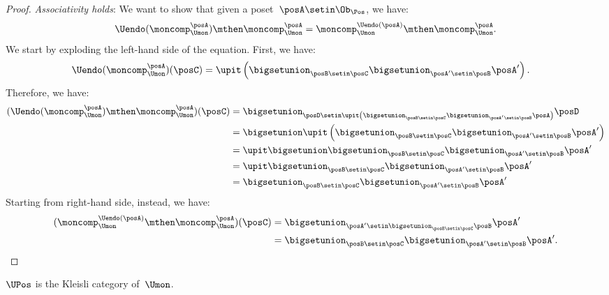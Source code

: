 \begin{proof}
    \emph{Associativity holds}: We want to show that given a poset~$\posA\setin \Ob_\Pos$, we have:
    \begin{equation}
        \Uendo(\moncomp_{\Umon}^{\posA})\mthen \moncomp_{\Umon}^{\posA}= \moncomp_{\Umon}^{\Uendo(\posA)}\mthen \moncomp_{\Umon}^{\posA}.
    \end{equation}
    We start by exploding the left-hand side of the equation.
    First, we have:
    \begin{equation}
        \begin{aligned}
            \Uendo(\moncomp_{\Umon}^{\posA})(\posC) & =\upit \left( \bigsetunion_{\posB\setin \posC}\bigsetunion_{\posA'\setin \posB} \posA'\right).
        \end{aligned}
    \end{equation}
    Therefore, we have:
    \begin{equation}
        \begin{aligned}
            (\Uendo(\moncomp_{\Umon}^{\posA})\mthen \moncomp_{\Umon}^{\posA})(\posC)
             & =\bigsetunion_{\posD \setin \upit \left( \bigsetunion_{\posB\setin \posC}\bigsetunion_{\posA'\setin \posB} \posA\right)} \posD \\
             & =\bigsetunion \upit \left( \bigsetunion_{\posB\setin \posC}\bigsetunion_{\posA'\setin \posB} \posA'\right) \\
             & =\upit \bigsetunion \bigsetunion_{\posB\setin \posC}\bigsetunion_{\posA'\setin \posB} \posA' \\
             & =\upit  \bigsetunion_{\posB\setin \posC}\bigsetunion_{\posA'\setin \posB} \posA' \\
             & = \bigsetunion_{\posB\setin \posC}\bigsetunion_{\posA'\setin \posB} \posA'
        \end{aligned}
    \end{equation}
    Starting from right-hand side, instead, we have:
    \begin{equation}
        \begin{aligned}
            (\moncomp_{\Umon}^{\Uendo(\posA)}\mthen \moncomp_{\Umon}^{\posA})(\posC)
             & =\bigsetunion_{\posA'\setin \bigsetunion_{\posB\setin \posC}\posB}\posA' \\
             & =\bigsetunion_{\posB\setin \posC}\bigsetunion_{\posA'\setin \posB} \posA'.
        \end{aligned}
    \end{equation}
\end{proof}

\begin{lemma}
    \label{lem:uposkleisli}
    $\UPos$ is the Kleisli category of~$\Umon$.
\end{lemma}
